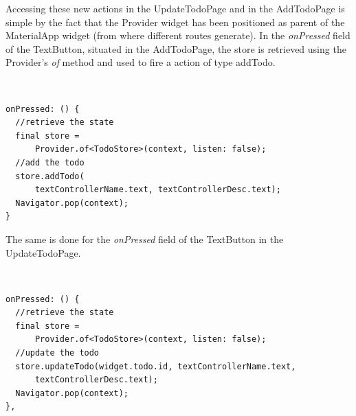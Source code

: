Accessing these new actions in the UpdateTodoPage and in the AddTodoPage is simple by the fact that the Provider widget has been positioned as parent of the MaterialApp widget (from where different routes generate). In the \textit{onPressed} field of the TextButton, situated in the AddTodoPage, the store is retrieved using the Provider’s \textit{of} method and used to fire a action of type addTodo. 
\begin{code}
\mbox{}\\
 \mbox{}
		\label{code:2.14}
\begin{verbatim}
onPressed: () {
  //retrieve the state
  final store =
      Provider.of<TodoStore>(context, listen: false);
  //add the todo  
  store.addTodo(
      textControllerName.text, textControllerDesc.text);
  Navigator.pop(context);
}
\end{verbatim}
\mbox{}
\end{code}

The same is done for the \textit{onPressed} field of the TextButton in the UpdateTodoPage.
\begin{code}
\mbox{}\\
 \mbox{}
		\label{code:2.14}
\begin{verbatim}
onPressed: () {
  //retrieve the state
  final store =
      Provider.of<TodoStore>(context, listen: false);
  //update the todo    
  store.updateTodo(widget.todo.id, textControllerName.text,
      textControllerDesc.text);
  Navigator.pop(context);
},
\end{verbatim}
\mbox{}
\end{code}


